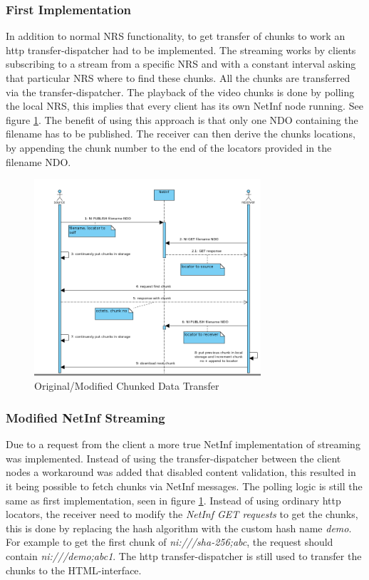 \subsubsection{First Implementation}
In addition to normal NRS functionality, to get transfer of chunks to work an http transfer-dispatcher had to be implemented. The streaming works by clients subscribing to a stream from a specific NRS and with a constant interval asking that particular NRS where to find these chunks. All the chunks are transferred via the transfer-dispatcher.
The playback of the video chunks is done by polling the local NRS, this implies that every client has its own NetInf node running. See figure \ref{fig:stream-seqorgmod}. The benefit of using this approach is that only one NDO containing the filename has to be published. The receiver can then derive the chunks locations, by appending the chunk number to the end of the locators provided in the filename NDO.

\begin{figure}[h!]
	\centering
		\includegraphics[width=0.75\textwidth]{./img/sequence_diagram_streaming_orgmod.png}
    	\caption{Original/Modified Chunked Data Transfer}
	\label{fig:stream-seqorgmod}
\end{figure}

\subsubsection{Modified NetInf Streaming}
Due to a request from the client a more true NetInf implementation of streaming was implemented. Instead of using the transfer-dispatcher between the client nodes a workaround was added that disabled content validation, this resulted in it being possible to fetch chunks via NetInf messages. The polling logic is still the same as first implementation, seen in figure \ref{fig:stream-seqorgmod}. Instead of using ordinary http locators, the receiver need to modify the \textit{NetInf GET requests} to get the chunks, this is done by replacing the hash algorithm with the custom hash name \textit{demo}. For example to get the first chunk of \textit{ni:///sha-256;abc}, the request should contain \textit{ni:///demo;abc1}. The http transfer-dispatcher is still used to transfer the chunks to the HTML-interface.

